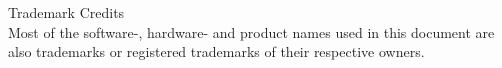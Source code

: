 \small{Trademark Credits\\
    Most of the software-, hardware- and product names used in this document
    are also trademarks or registered trademarks of their respective owners.
}
